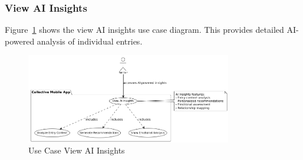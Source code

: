 \subsubsection{View AI Insights}

Figure~\ref{fig:usecase-view-ai-insights} shows the view AI insights use case diagram. This provides detailed AI-powered analysis of individual entries.

\begin{figure}[H]
\centering
\includegraphics[width=0.8\textwidth]{files/imgs/usecase_U9ojKijEmp.png}
\caption{Use Case View AI Insights}
\label{fig:usecase-view-ai-insights}
\end{figure}

